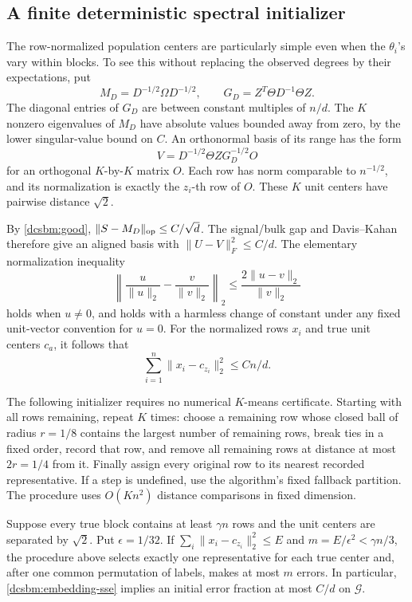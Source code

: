 \subsection{A finite deterministic spectral initializer}

The row-normalized population centers are particularly simple even when
the \(\theta_i\)'s vary within blocks.  To see this without replacing the
observed degrees by their expectations, put
\[
 M_D=D^{-1/2}\Omega D^{-1/2},\qquad
 G_D=Z^T\Theta D^{-1}\Theta Z.
\]
The diagonal entries of \(G_D\) are between constant multiples of \(n/d\).
The \(K\) nonzero eigenvalues of \(M_D\) have absolute values bounded
away from zero, by the lower singular-value bound on \(C\).
An orthonormal basis of its range has the form
\begin{equation}
 V=D^{-1/2}\Theta ZG_D^{-1/2}O
 \label{dcsbm:population-basis}
\end{equation}
for an orthogonal \(K\)-by-\(K\) matrix \(O\).  Each row has norm
comparable to \(n^{-1/2}\), and its normalization is exactly the
\(z_i\)-th row of \(O\).  These \(K\) unit centers have pairwise distance
\(\sqrt2\).

By \cref{dcsbm:good},
\(\|S-M_D\|_{\mathrm{op}}\le C/\sqrt d\).  The signal/bulk gap and
Davis--Kahan therefore give an aligned basis with
\(\|U-V\|_F^2\le C/d\).  The elementary normalization inequality
\[
 \left\|\frac{u}{\|u\|_2}-\frac{v}{\|v\|_2}\right\|_2
 \le \frac{2\|u-v\|_2}{\|v\|_2}
\]
holds when \(u\ne0\), and holds with a harmless change of constant
under any fixed unit-vector convention for \(u=0\).  For the normalized
rows \(x_i\) and true unit centers \(c_a\), it follows that
\begin{equation}
 \sum_{i=1}^n\|x_i-c_{z_i}\|_2^2\le Cn/d.
 \label{dcsbm:embedding-sse}
\end{equation}

The following initializer requires no numerical \(K\)-means certificate.
Starting with all rows remaining, repeat \(K\) times: choose a remaining
row whose closed ball of radius \(r=1/8\) contains the largest number
of remaining rows, break ties in a fixed order, record that row, and
remove all remaining rows at distance at most \(2r=1/4\) from it.
Finally assign every original row to its nearest recorded representative.
If a step is undefined, use the algorithm's fixed fallback partition.
The procedure uses \(O(Kn^2)\) distance comparisons in fixed dimension.

\begin{lemma}
\label{dcsbm:initializer}
Suppose every true block contains at least \(\gamma n\) rows and
the unit centers are separated by \(\sqrt2\).  Put
\(\epsilon=1/32\).  If
\(\sum_i\|x_i-c_{z_i}\|_2^2\le E\) and
\(m=E/\epsilon^2<\gamma n/3\), the procedure above selects exactly
one representative for each true center and, after one common
permutation of labels, makes at most \(m\) errors.  In particular,
\cref{dcsbm:embedding-sse} implies an initial error fraction at most
\(C/d\) on \(\mathcal G\).
\end{lemma}

